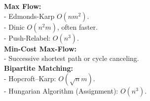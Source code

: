 \textbf{Max Flow:} \\[1mm]
- Edmonds-Karp $O(nm^2)$. \\
- Dinic $O(n^2 m)$, often faster. \\
- Push-Relabel: $O(n^3)$. \\

\textbf{Min-Cost Max-Flow:} \\[1mm]
- Successive shortest path or cycle canceling. \\

\textbf{Bipartite Matching:} \\[1mm]
- Hopcroft–Karp: $O(\sqrt{n}m)$. \\
- Hungarian Algorithm (Assignment): $O(n^3)$. \\
